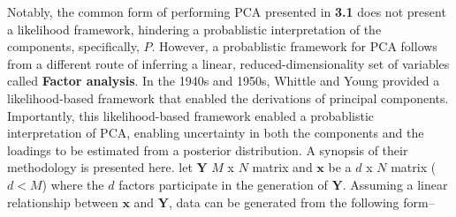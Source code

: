 \documentclass[english, 11pt]{article}\usepackage[]{graphicx}\usepackage[]{color}
\begin{document}
Notably, the common form of performing PCA presented in \textbf{3.1} does not present a likelihood framework, hindering a probablistic interpretation of the components, specifically, $P$. However, a probablistic framework for PCA follows from a different route of inferring a linear, reduced-dimensionality set of variables called \textbf{Factor analysis}. \newline \newline In the 1940s and 1950s, Whittle \cite{whittle1952principal} and Young \cite{young1941maximum} provided a likelihood-based framework that enabled the derivations of principal components. Importantly, this likelihood-based framework enabled a probablistic interpretation of PCA, enabling uncertainty in both the components and the loadings to be estimated from a posterior distribution. A synopsis of their methodology is presented here.
\newline \newline
let $\mathbf{Y}$ $M$ x $N$ matrix and $\mathbf{x}$ be a $d$ x $N$ matrix ($d < M$) where the $d$ factors participate in the generation of $\mathbf{Y}$. Assuming a linear relationship between $\mathbf{x}$ and $\mathbf{Y}$, data can be generated from the following form--
\end{document}
